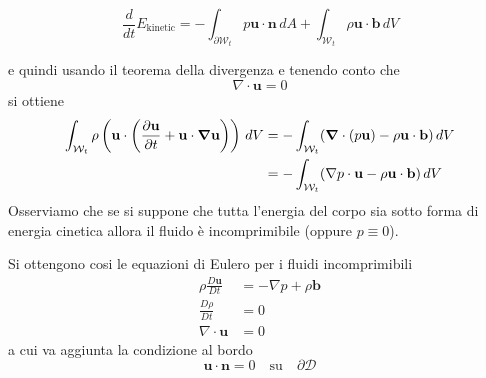 \begin{equation*}
\frac{d}{dt} E_{\text{kinetic}} = - \int_{\partial \mathcal{W}_t} p \mathbf{u} \cdot \mathbf{n} \, dA + \int_{\mathcal{W}_t} \rho \mathbf{u} \cdot \mathbf{b} \, dV
\end{equation*}

e quindi usando il teorema della divergenza e tenendo conto che
\begin{equation*}
\nabla \cdot \mathbf{u} = 0
\end{equation*}
si ottiene
\begin{align*}
\int_{\mathcal{W}_t} \rho \left ( \mathbf{u} \cdot \left ( \frac{\partial \mathbf{u}}{\partial t} + \mathbf{u} \cdot \boldsymbol{\nabla} \mathbf{u} \right )\right ) \, dV
 &= - \int_{\mathcal{W}_t} ( \boldsymbol{\nabla} \cdot (p\mathbf{u}) - \rho \mathbf{u} \cdot \mathbf{b}) \, dV \\
 &=  - \int_{\mathcal{W}_t} ( \nabla p  \cdot \mathbf{u} - \rho \mathbf{u} \cdot \mathbf{b}) \, dV
\end{align*}
Osserviamo che se si suppone che tutta l'energia del corpo sia sotto forma di energia cinetica allora il fluido è incomprimibile (oppure $p\equiv 0$).
 
Si ottengono cosi le equazioni di Eulero per i fluidi incomprimibili
\begin{equation}
\boxed{
\begin{aligned}
\rho \frac{D\mathbf{u}}{Dt} &= - \nabla p + \rho \mathbf{b} \\
\frac{D \rho }{Dt} &= 0 \\
\nabla \cdot \mathbf{u} &= 0
\end{aligned}
}
\end{equation}
a cui va aggiunta la condizione al bordo 
\begin{equation}\mathbf{u} \cdot \mathbf{n} = 0 \quad \text{su} \quad \partial \mathcal{D}
\end{equation}

